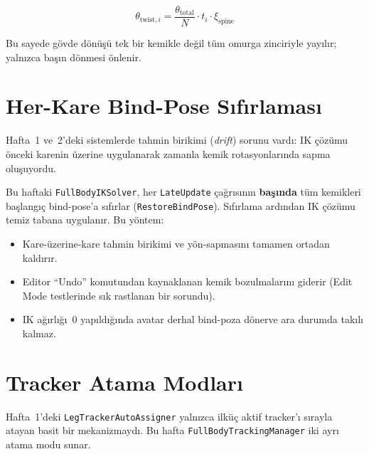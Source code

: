 \documentclass[11pt,a4paper]{article}
\begin{document}
\begin{equation}
    \theta_{\text{twist},i}
    = \frac{\theta_{\text{total}}}{N} \cdot t_i \cdot \xi_{\text{spine}}
    \label{eq:twist}
\end{equation}

Bu sayede g\"ovde d\"on\"u\c{s}\"u tek bir kemikle de\u{g}il t\"um omurga
zinciriyle yay{\i}l{\i}r; yaln{\i}zca ba\c{s}{\i}n d\"onmesi
\"onlenir.

\section{Her-Kare Bind-Pose S{\i}f{\i}rlamas{\i}}
\label{sec:bindpose}

Hafta~1 ve~2'deki sistemlerde tahmin birikimi (\textit{drift})
sorunu vard{\i}: IK \c{c}\"oz\"umu \"onceki karenin \"uzerine
uygulanarak zamanla kemik rotasyonlar{\i}nda sapma olu\c{s}uyordu.

Bu haftaki \texttt{FullBodyIKSolver}, her \texttt{LateUpdate}
\c{c}a\u{g}r{\i}s{\i}n{\i}n \textbf{ba\c{s}{\i}nda} t\"um kemikleri
ba\c{s}lang{\i}\c{c} bind-pose'a s{\i}f{\i}rlar
(\texttt{RestoreBindPose}). S{\i}f{\i}rlama ard{\i}ndan IK
\c{c}\"oz\"umu temiz tabana uygulan{\i}r. Bu y\"ontem:

\begin{itemize}[nosep]
    \item Kare-\"uzerine-kare tahmin birikimi ve y\"on-sapmas{\i}n{\i}
          tamamen ortadan kald{\i}r{\i}r.
    \item Editor ``Undo'' komutundan kaynaklanan kemik bozulmalar{\i}n{\i}
          giderir (Edit Mode testlerinde s{\i}k rastlanan bir sorundu).
    \item IK a\u{g}{\i}rl{\i}\u{g}{\i}~0 yap{\i}ld{\i}\u{g}{\i}nda
          avatar derhal bind-poza d\"onerve ara durumda tak{\i}l{\i}
          kalmaz.
\end{itemize}

\section{Tracker Atama Modlar{\i}}
\label{sec:atama}

Hafta~1'deki \texttt{LegTrackerAutoAssigner} yaln{\i}zca ilk\"u\c{c}
aktif tracker'{\i} s{\i}rayla atayan basit bir mekanizmayd{\i}.
Bu hafta \texttt{FullBodyTrackingManager} iki ayr{\i} atama modu
sunar.
\end{document}
